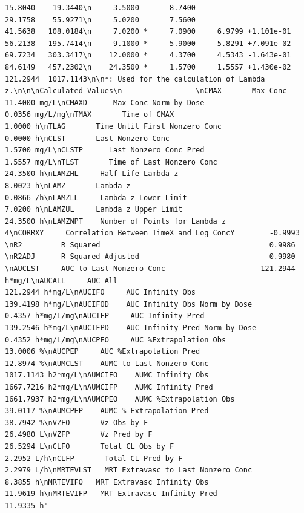 \documentclass[12pt,]{krantz}
\theoremstyle{definition}
\theoremstyle{definition}
\theoremstyle{definition}
\theoremstyle{remark}
\begin{document}
\begin{verbatim}
15.8040    19.3440\n     3.5000       8.7400                          29.1758    55.9271\n     5.0200       7.5600                          41.5638   108.0184\n     7.0200 *     7.0900     6.9799 +1.101e-01    56.2138   195.7414\n     9.1000 *     5.9000     5.8291 +7.091e-02    69.7234   303.3417\n    12.0000 *     4.3700     4.5343 -1.643e-01    84.6149   457.2302\n    24.3500 *     1.5700     1.5557 +1.430e-02   121.2944  1017.1143\n\n*: Used for the calculation of Lambda z.\n\n\nCalculated Values\n-----------------\nCMAX       Max Conc                                       11.4000 mg/L\nCMAXD      Max Conc Norm by Dose                           0.0356 mg/L/mg\nTMAX       Time of CMAX                                    1.0000 h\nTLAG       Time Until First Nonzero Conc                   0.0000 h\nCLST       Last Nonzero Conc                               1.5700 mg/L\nCLSTP      Last Nonzero Conc Pred                          1.5557 mg/L\nTLST       Time of Last Nonzero Conc                      24.3500 h\nLAMZHL     Half-Life Lambda z                              8.0023 h\nLAMZ       Lambda z                                        0.0866 /h\nLAMZLL     Lambda z Lower Limit                            7.0200 h\nLAMZUL     Lambda z Upper Limit                           24.3500 h\nLAMZNPT    Number of Points for Lambda z                   4\nCORRXY     Correlation Between TimeX and Log ConcY        -0.9993 \nR2         R Squared                                       0.9986 \nR2ADJ      R Squared Adjusted                              0.9980 \nAUCLST     AUC to Last Nonzero Conc                      121.2944 h*mg/L\nAUCALL     AUC All                                       121.2944 h*mg/L\nAUCIFO     AUC Infinity Obs                              139.4198 h*mg/L\nAUCIFOD    AUC Infinity Obs Norm by Dose                   0.4357 h*mg/L/mg\nAUCIFP     AUC Infinity Pred                             139.2546 h*mg/L\nAUCIFPD    AUC Infinity Pred Norm by Dose                  0.4352 h*mg/L/mg\nAUCPEO     AUC %Extrapolation Obs                         13.0006 %\nAUCPEP     AUC %Extrapolation Pred                        12.8974 %\nAUMCLST    AUMC to Last Nonzero Conc                    1017.1143 h2*mg/L\nAUMCIFO    AUMC Infinity Obs                            1667.7216 h2*mg/L\nAUMCIFP    AUMC Infinity Pred                           1661.7937 h2*mg/L\nAUMCPEO    AUMC %Extrapolation Obs                        39.0117 %\nAUMCPEP    AUMC % Extrapolation Pred                      38.7942 %\nVZFO       Vz Obs by F                                    26.4980 L\nVZFP       Vz Pred by F                                   26.5294 L\nCLFO       Total CL Obs by F                               2.2952 L/h\nCLFP       Total CL Pred by F                              2.2979 L/h\nMRTEVLST   MRT Extravasc to Last Nonzero Conc              8.3855 h\nMRTEVIFO   MRT Extravasc Infinity Obs                     11.9619 h\nMRTEVIFP   MRT Extravasc Infinity Pred                    11.9335 h"
\end{verbatim}
\end{document}
